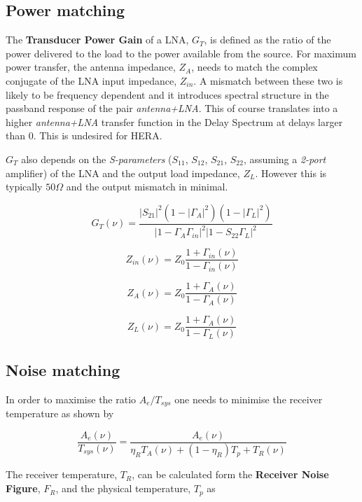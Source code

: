 \documentclass[11pt]{article}
\begin{document}
\subsection{Power matching}
The {\bf Transducer Power Gain} of a LNA, $G_T$, is defined as the ratio of the power delivered to the load to the power available from the source.
For maximum power transfer, the antenna impedance, $Z_A$, needs to match the complex conjugate of the LNA input impedance, $Z_{in}$. A mismatch between these two is likely to be frequency dependent and it introduces spectral structure in the passband response of the pair {\em antenna+LNA}. This of course translates into a higher {\em antenna+LNA} transfer function in the Delay Spectrum at delays larger than 0. This is undesired for HERA.

$G_T$ also depends on the {\em S-parameters} ($S_{11}$, $S_{12}$, $S_{21}$, $S_{22}$, assuming a {\em 2-port} amplifier) of the LNA and the output load impedance, $Z_L$. However this is typically $50\Omega$ and the output mismatch in minimal.

\begin{equation}
G_{T}(\nu) =\frac{|S_{21}|^2(1-|\Gamma_A|^2)(1-|\Gamma_L|^2)}{|1-\Gamma_A\Gamma_{in}|^2|1-S_{22}\Gamma_{L}|^2}
\end{equation}

\begin{equation}
Z_{in}(\nu) = Z_0\frac{1+\Gamma_{in}(\nu)}{1-\Gamma_{in}(\nu)}
\end{equation}

\begin{equation}
Z_{A}(\nu) = Z_0\frac{1+\Gamma_{A}(\nu)}{1-\Gamma_{A}(\nu)}
\end{equation}

\begin{equation}
Z_{L}(\nu) = Z_0\frac{1+\Gamma_{A}(\nu)}{1-\Gamma_{L}(\nu)}
\end{equation}

\subsection{Noise matching}
In order to maximise the ratio $A_e/T_{sys}$ one needs to minimise the receiver temperature as shown by 

\begin{equation}
\frac{A_{e}(\nu)}{T_{sys}(\nu)} = \frac{A_{e}(\nu)}{\eta_R T_A(\nu) + (1-\eta_R)T_p + T_R(\nu)}
\end{equation}

The receiver temperature, $T_R$, can be calculated form the {\bf Receiver Noise Figure}, $F_R$, and the physical temperature, $T_p$ as
\end{document}
